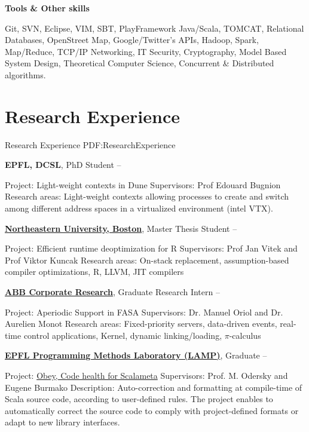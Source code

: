 \documentclass[a4paper,10pt,oneside]{article}
\begin{document}
\begin{body}
\EntryGap
\textbf{Tools \& Other skills}
\par
\begin{skilling}
Git, SVN, Eclipse, VIM, SBT, PlayFramework Java/Scala, TOMCAT,
Relational Databases, OpenStreet Map, Google/Twitter's APIs, Hadoop, Spark, Map/Reduce,
TCP/IP Networking, IT Security, Cryptography, Model Based System Design, Theoretical Computer Science,
Concurrent \& Distributed algorithms.
\end{skilling}

\hline

\section
{Research Experience}
{Research Experience}
{PDF:ResearchExperience}

{\textbf{EPFL, DCSL}},
PhD Student
\hfill
{} --
\begin{detail}
\BulletItem
Project:
Light-weight contexts in Dune
\BulletItem
Supervisors:
Prof Edouard Bugnion
\BulletItem
Research areas:
Light-weight contexts allowing processes to create and switch among different address spaces in a virtualized environment (intel VTX).
\end{detail}

\href{http://http://www.ccs.neu.edu/research/prl/}
{\textbf{Northeastern University, Boston}},
Master Thesis Student
\hfill
{} --
\begin{detail}
\BulletItem
Project:
Efficient runtime deoptimization for R 
\BulletItem
Supervisors:
Prof Jan Vitek and
Prof Viktor Kuncak
\BulletItem
Research areas:
On-stack replacement, assumption-based compiler optimizations, R, LLVM, JIT compilers
\end{detail}

\href{http://www.abb.com/}
{\textbf{ABB Corporate Research}},
Graduate Research Intern
\hfill
{} --
\begin{detail}
\BulletItem
Project:
Aperiodic Support in FASA
\BulletItem
Supervisors:
Dr. Manuel Oriol and
Dr. Aurelien Monot
\BulletItem
Research areas:
Fixed-priority servers, data-driven events, real-time control applications, Kernel, dynamic linking/loading, $\pi$-calculus 
\end{detail}

\EntryGap
\href{http://lamp.epfl.ch/}
{\textbf{EPFL Programming Methods Laboratory (LAMP)}},
Graduate
\hfill
{} --
\begin{detail}
\BulletItem
Project:
\href{http://infoscience.epfl.ch/record/204804?ln=en}
{Obey, Code health for Scalameta}
\BulletItem
Supervisors:
Prof. M. Odersky and 
Eugene Burmako
\BulletItem
Description:
Auto-correction and formatting at compile-time of Scala source code, according to user-defined rules.
The project enables to automatically correct the source code to comply with project-defined formats or adapt to new library interfaces.
\end{detail}


\end{body}
\end{document}
